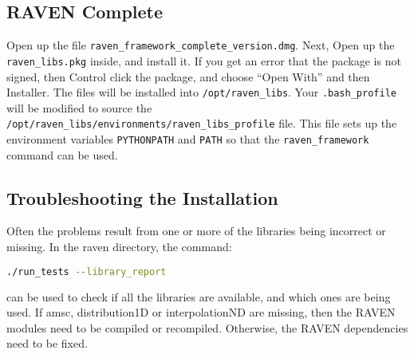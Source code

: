\subsection{RAVEN Complete}

Open up the file \texttt{raven\_framework\_complete\_version.dmg}.
%
Next, Open up the \texttt{raven\_libs.pkg} inside, and install it.  If
you get an error that the package is not signed, then Control click
the package, and choose ``Open With'' and then Installer.
%
The files will be installed into \texttt{/opt/raven\_libs}.
%
Your \texttt{.bash\_profile} will be modified to source the
\texttt{/opt/raven\_libs/environments/raven\_libs\_profile} file.
%
This file sets up the environment variables \texttt{PYTHONPATH} and
\texttt{PATH} so that the \texttt{raven\_framework} command can be used.

\subsection{Troubleshooting the Installation}

Often the problems result from one or more of the libraries being
incorrect or missing.  In the raven directory, the command:

\begin{lstlisting}[language=bash]
./run_tests --library_report
\end{lstlisting}
can be used to check if all the libraries are available, and which
ones are being used.  If amsc, distribution1D or interpolationND are
missing, then the RAVEN modules need to be compiled or recompiled.
Otherwise, the RAVEN dependencies need to be fixed.



